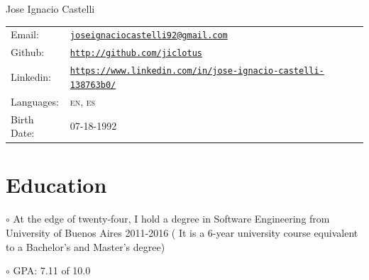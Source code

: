 \documentclass[letterpaper]{article}
\def\name{Jose Ignacio Castelli}
\newenvironment{no-indent-itemize}{
  \begin{list}{}{
    \setlength{\leftmargin}{0em}
  }
}{
  \end{list}
}
\def\bullet{$\circ$\xspace}
\begin{document}
{\huge \name}



\bigskip
\begin{minipage}{0.45\linewidth}
  \begin{tabular}{llll}
    
    
    Email: & \href{mailto:joseignaciocastelli92@gmail.com}{\tt joseignaciocastelli92@gmail.com} \\
     
    
    Github: &\href{http://github.com/jiclotus}{\tt http://github.com/jiclotus}\\
    
    Linkedin: &\href{https://www.linkedin.com/in/jose-ignacio-castelli-138763b0/}{\tt https://www.linkedin.com/in/jose-ignacio-castelli-138763b0/}\\
    
    Languages: & \textsc{en}, \textsc{es}\\
    Birth Date: & \textsc{07-18-1992}
    
    
  \end{tabular}
\end{minipage}


\hfill 
{}


\section*{Education}
\begin{no-indent-itemize}
  \item\bullet At the edge of twenty-four, I hold a degree in Software Engineering from University of Buenos Aires 2011-2016 ( It is a 6-year university course equivalent to a Bachelor's and Master's degree) 
  \item\bullet GPA: 7.11 of 10.0
\end{no-indent-itemize}
\end{document}
